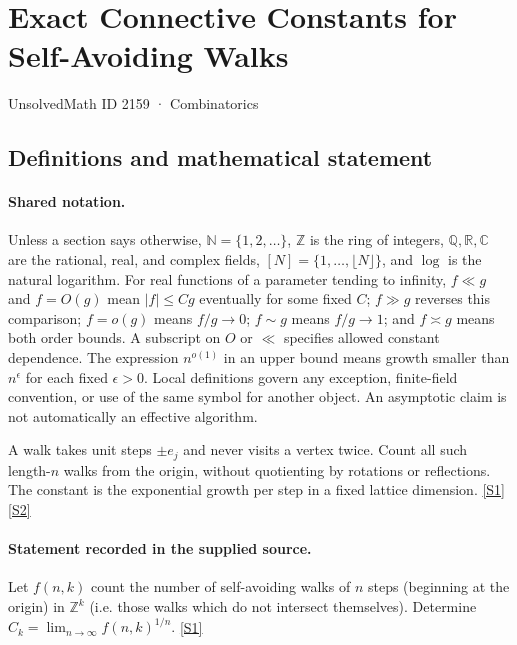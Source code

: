 \documentclass[11pt,a4paper]{article}
\newcommand{\N}{\mathbb{N}}
\newcommand{\Z}{\mathbb{Z}}
\newcommand{\Q}{\mathbb{Q}}
\newcommand{\R}{\mathbb{R}}
\newcommand{\C}{\mathbb{C}}
\newcommand{\sref}[2]{\hyperlink{source:#1:#2}{[S#2]}}
\begin{document}

\setcounter{section}{2158}

\section{Exact Connective Constants for Self-Avoiding Walks}\label{2159}

{\small\sffamily UnsolvedMath ID 2159 · Combinatorics}

\subsection{Definitions and mathematical statement}

\paragraph{Shared notation.}Unless a section says otherwise, $\N=\{1,2,\ldots\}$,
$\Z$ is the ring of integers, $\Q,\R,\C$ are the rational, real, and complex
fields, $[N]=\{1,\ldots,\lfloor N\rfloor\}$, and $\log$ is the natural
logarithm. For real functions of a parameter tending to infinity,
$f\ll g$ and $f=O(g)$ mean $|f|\leq Cg$ eventually for some fixed $C$;
$f\gg g$ reverses this comparison; $f=o(g)$ means $f/g\to0$;
$f\sim g$ means $f/g\to1$; and $f\asymp g$ means both order bounds.
A subscript on $O$ or $\ll$ specifies allowed constant dependence.
The expression $n^{o(1)}$ in an upper bound means growth smaller than
$n^\epsilon$ for each fixed $\epsilon>0$. Local definitions govern any
exception, finite-field convention, or use of the same symbol for another
object. An asymptotic claim is not automatically an effective algorithm.



A walk takes unit steps $\pm e_j$ and never visits a vertex twice. Count all such length-$n$ walks from the origin, without quotienting by rotations or reflections. The constant is the exponential growth per step in a fixed lattice dimension. \sref{2159}{1} \sref{2159}{2}

\paragraph{Statement recorded in the supplied source.}
Let $f(n,k)$ count the number of self-avoiding walks of $n$ steps (beginning at the origin) in $\mathbb{Z}^k$ (i.e. those walks which do not intersect themselves). Determine $ C_k=\lim_{n\to\infty}f(n,k)^{1/n}. $ \sref{2159}{1}
\end{document}
